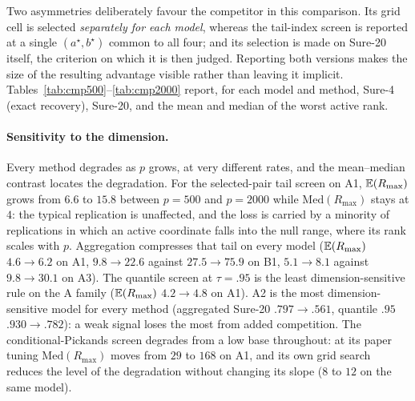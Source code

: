 Two asymmetries deliberately favour the competitor in this comparison.
Its grid cell is selected \emph{separately for each model}, whereas the
tail-index screen is reported at a single $(a^\star,b^\star)$ common to
all four; and its selection is made on Sure-20 itself, the criterion on
which it is then judged. Reporting both versions makes the size of the
resulting advantage visible rather than leaving it implicit.
Tables~\ref{tab:cmp500}--\ref{tab:cmp2000} report, for each model and
method, Sure-4 (exact recovery), Sure-20, and the mean and median of the
worst active rank.







\paragraph{Sensitivity to the dimension.}
Every method degrades as $p$ grows, at very different rates, and the
mean--median contrast locates the degradation. For the selected-pair
tail screen on A1, $\mathbb E(R_{\max})$ grows from $6.6$ to $15.8$ between
$p=500$ and $p=2000$ while $\mathrm{Med}(R_{\max})$ stays at $4$: the
typical replication is unaffected, and the loss is carried by a
minority of replications in which an active coordinate falls into the
null range, where its rank scales with $p$. Aggregation compresses that
tail on every model ($\mathbb E(R_{\max})$ $4.6\to6.2$ on A1, $9.8\to22.6$
against $27.5\to75.9$ on B1, $5.1\to8.1$ against $9.8\to30.1$ on A3).
The quantile screen at $\tau=.95$ is the least dimension-sensitive rule
on the A family ($\mathbb E(R_{\max})$ $4.2\to4.8$ on A1). A2 is the most
dimension-sensitive model for every method (aggregated Sure-20
$.797\to.561$, quantile $.95$ $.930\to.782$): a weak signal loses the
most from added competition. The conditional-Pickands screen degrades
from a low base throughout: at its paper tuning
$\mathrm{Med}(R_{\max})$ moves from $29$ to $168$ on A1, and its own
grid search reduces the level of the degradation without changing its
slope ($8$ to $12$ on the same model).

